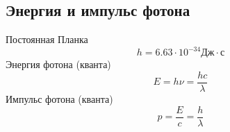 \subsection{Энергия и импульс фотона}

Постоянная Планка
\begin{equation}
h=6.63\cdot 10^{-34} \text{Дж}\cdot\text{с}
\end{equation}
Энергия фотона (кванта)
\begin{equation}
E=h\nu=\frac{hc}{\lambda}
\end{equation}
Импульс фотона (кванта)
\begin{equation}
p=\frac{E}{c}=\frac{h}{\lambda}
\end{equation}